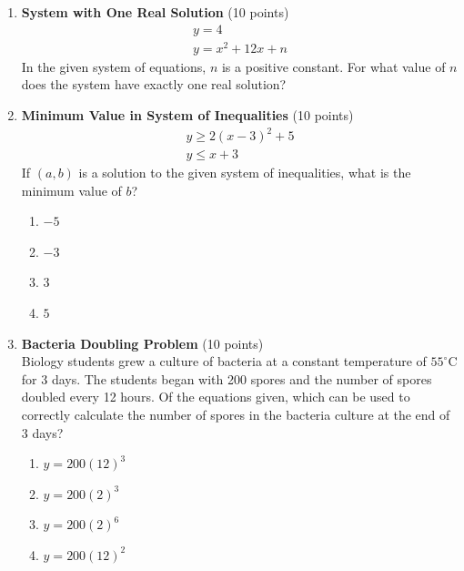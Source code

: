 \begin{enumerate}
  \item \textbf{System with One Real Solution} (10 points)\\
  \[
    \begin{gathered}
    y=4 \\
    y=x^2+12x+n
    \end{gathered}
  \]
  In the given system of equations, $n$ is a positive constant. For what value of $n$ does the system have exactly one real solution?
  \begin{subanswer}
  \end{subanswer}

  \item \textbf{Minimum Value in System of Inequalities} (10 points)\\
  \[
    \begin{gathered}
    y \geq 2(x-3)^2+5 \\
    y \leq x+3
    \end{gathered}
  \]
  If $(a, b)$ is a solution to the given system of inequalities, what is the minimum value of $b$?
  \begin{enumerate}[label=\Alph*.]
    \item $-5$
    \item $-3$
    \item $3$
    \item $5$
  \end{enumerate}
  \begin{subanswer}
  \end{subanswer}


  \newpage

  \item \textbf{Bacteria Doubling Problem} (10 points)\\
  Biology students grew a culture of bacteria at a constant temperature of $55^\circ\mathrm{C}$ for 3 days. The students began with 200 spores and the number of spores doubled every 12 hours. Of the equations given, which can be used to correctly calculate the number of spores in the bacteria culture at the end of 3 days?
  \begin{enumerate}[label=\Alph*.]
    \item $y=200(12)^3$
    \item $y=200(2)^3$
    \item $y=200(2)^6$
    \item $y=200(12)^2$
  \end{enumerate}
  \begin{subanswer}
  \end{subanswer}


\end{enumerate}
